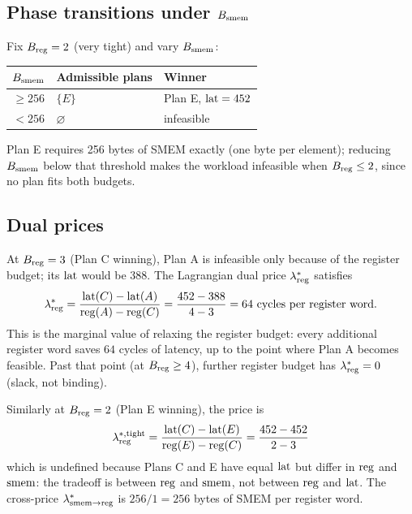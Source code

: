 \subsection{Phase transitions under $B_{\operatorname{smem}}$}
\label{app-e:phase-smem}

Fix $B_{\operatorname{reg}} = 2$ (very tight) and vary $B_{\operatorname{smem}}$:

\begin{center}
\begin{tabular}{c|l|l}
$B_{\operatorname{smem}}$ & Admissible plans & Winner \\
\hline
$\geq 256$ & $\{E\}$       & Plan E, $\operatorname{lat} = 452$ \\
$< 256$    & $\varnothing$ & infeasible \\
\end{tabular}
\end{center}

Plan E requires 256 bytes of SMEM exactly (one byte
per element); reducing $B_{\operatorname{smem}}$ below that
threshold makes the workload infeasible when
$B_{\operatorname{reg}} \leq 2$, since no plan fits both budgets.

\subsection{Dual prices}\label{app-e:dual}

At $B_{\operatorname{reg}} = 3$ (Plan C winning), Plan A is
infeasible only because of the register budget; its
$\operatorname{lat}$ would be 388. The Lagrangian dual price
$\lambda_{\operatorname{reg}}^*$ satisfies
\begin{equation}
  \lambda_{\operatorname{reg}}^* = \frac{\operatorname{lat}(C) - \operatorname{lat}(A)}
                          {\operatorname{reg}(A) - \operatorname{reg}(C)}
                   = \frac{452 - 388}{4 - 3}
                   = 64 \text{ cycles per register word}.
\end{equation}
This is the marginal value of relaxing the register
budget: every additional register word saves
$64$ cycles of latency, up to the point where Plan A
becomes feasible. Past that point (at $B_{\operatorname{reg}}
\geq 4$), further register budget has
$\lambda_{\operatorname{reg}}^* = 0$ (slack, not binding).

Similarly at $B_{\operatorname{reg}} = 2$ (Plan E winning), the
price is
\begin{equation}
  \lambda_{\operatorname{reg}}^{*,\text{tight}}
  = \frac{\operatorname{lat}(C) - \operatorname{lat}(E)}{\operatorname{reg}(E) - \operatorname{reg}(C)}
  = \frac{452 - 452}{2 - 3}
\end{equation}
which is undefined because Plans C and E have equal
$\operatorname{lat}$ but differ in $\operatorname{reg}$ and $\operatorname{smem}$: the
tradeoff is between $\operatorname{reg}$ and $\operatorname{smem}$, not between
$\operatorname{reg}$ and $\operatorname{lat}$. The cross-price
$\lambda_{\operatorname{smem} \to \operatorname{reg}}^*$ is $256/1 = 256$ bytes
of SMEM per register word.

